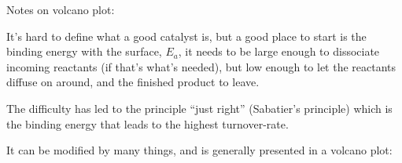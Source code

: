 \begin{columns}
\begin{subcolumns}
{Notes on volcano plot:

It's hard to define what a good catalyst is, but a good place to start is the binding energy with the surface, $E_{a}$, it needs to be large enough to dissociate incoming reactants (if that's what's needed), but low enough to let the reactants diffuse on around, and the finished product to leave. 

The difficulty has led to the principle ``just right'' (Sabatier's principle) which is the binding energy that leads to the highest turnover-rate.

It can be modified by many things, and is generally presented in a volcano plot:

}

        \end{subcolumns}

\end{columns}
